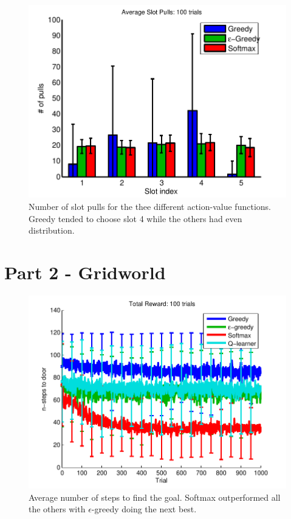 \documentclass[letterpaper, 11 pt]{article}
\begin{document}
\begin{figure}[htb]
	\centering
	\includegraphics[scale=0.6]{../figures/part1_hits.pdf}
	\caption{\small	Number of slot pulls for the thee different action-value functions.
					Greedy tended to choose slot 4 while the others had even distribution.
			}
	\label{fig:pathsa}
\end{figure}




\pagebreak
\section{Part 2 - Gridworld}



\begin{figure}[htb]
	\centering
	\includegraphics[scale=0.7]{../figures/part2.pdf}
	\caption{\small	Average number of steps to find the goal.  Softmax outperformed
					all the others with $\epsilon$-greedy doing the next best.
			}
	\label{fig:pathsa}
\end{figure}
\end{document}
